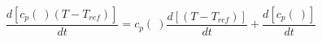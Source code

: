 \begin{equation}
\frac{d [c_p(\ ) (T- T_{ref})]}{dt} =c_p(\ ) \frac{d [ (T- T_{ref})]}{dt} + \frac{d [c_p(\ ) ]}{dt}
\end{equation}